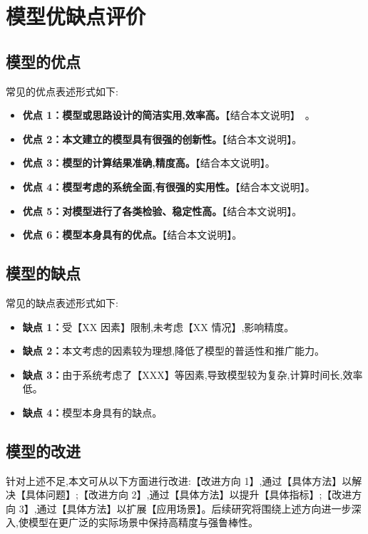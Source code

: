 
\section{模型优缺点评价}


\subsection{模型的优点}

常见的优点表述形式如下:

\begin{itemize}[itemindent=2em]
  \item \textbf{优点 1：模型或思路设计的简洁实用,效率高。}【结合本文说明】~\cite{ref1}。
  \item \textbf{优点 2：本文建立的模型具有很强的创新性。}【结合本文说明】。
  \item \textbf{优点 3：模型的计算结果准确,精度高。}【结合本文说明】。
  \item \textbf{优点 4：模型考虑的系统全面,有很强的实用性。}【结合本文说明】。
  \item \textbf{优点 5：对模型进行了各类检验、稳定性高。}【结合本文说明】。
  \item \textbf{优点 6：模型本身具有的优点。}【结合本文说明】。
\end{itemize}

\subsection{模型的缺点}

常见的缺点表述形式如下:

\begin{itemize}[itemindent=2em]
  \item \textbf{缺点 1：}受【XX 因素】限制,未考虑【XX 情况】,影响精度。
  \item \textbf{缺点 2：}本文考虑的因素较为理想,降低了模型的普适性和推广能力。
  \item \textbf{缺点 3：}由于系统考虑了【XXX】等因素,导致模型较为复杂,计算时间长,效率低。
  \item \textbf{缺点 4：}模型本身具有的缺点。
\end{itemize}

\subsection{模型的改进}


针对上述不足,本文可从以下方面进行改进:【改进方向 1】,通过【具体方法】以解决【具体问题】;【改进方向 2】,通过【具体方法】以提升【具体指标】;【改进方向 3】,通过【具体方法】以扩展【应用场景】。后续研究将围绕上述方向进一步深入,使模型在更广泛的实际场景中保持高精度与强鲁棒性。
